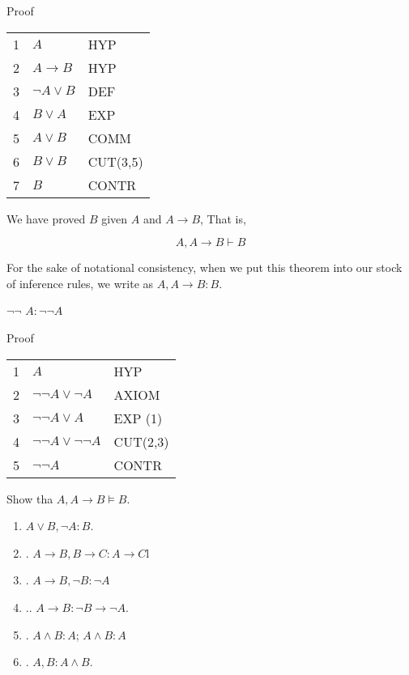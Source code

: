 \begin{indent}
Proof
\begin{tabular}{lll}
1 & $A$ & HYP \\
2 & $A \to B$ & HYP \\
3 & $\neg A \lor B$ & DEF \\
4 & $B \lor A$ & EXP \\
5 & $A \lor B$ & COMM \\
6 & $B \lor B$ & CUT(3,5) \\
7 & $B$ & CONTR \\
\end{tabular}
\end{indent}

We have proved $B$ given $A$ and $A \to B$,  That is,

$$
A, A \to B \vdash B
$$

For the sake of notational consistency, when we put this theorem into our stock of inference rules, we write as $A, A \to B : B$.

$\neg \neg$  $A : \neg \neg A$


\begin{indent}
Proof
\begin{tabular}{lll}
1 & $A$ & HYP \\
2 & $\neg \neg A \lor \neg A$ & AXIOM  \\
3 & $\neg \neg A \lor A$ & EXP (1) \\
4 &  $\neg \neg A \lor \neg \neg A$ & CUT(2,3) \\
5 & $\neg \neg A $ & CONTR \\
\end{tabular}
\end{indent}
\begin{exercise}
Show tha $A, A \to B \models B$.
\end{exercise}


\begin{enumerate}

\item {} $A \lor B, \neg A : B$.

\item {}. $A \to B, B \to C : A \to C$l

\item {}. $A \to B, \neg B : \neg A$

\item {}.. $A \to B : \neg B \to \neg A$.

\item {}. $A \land B : A$; $A \land B : A$

\item {}. $A, B : A \land B$.

\end{enumerate}

